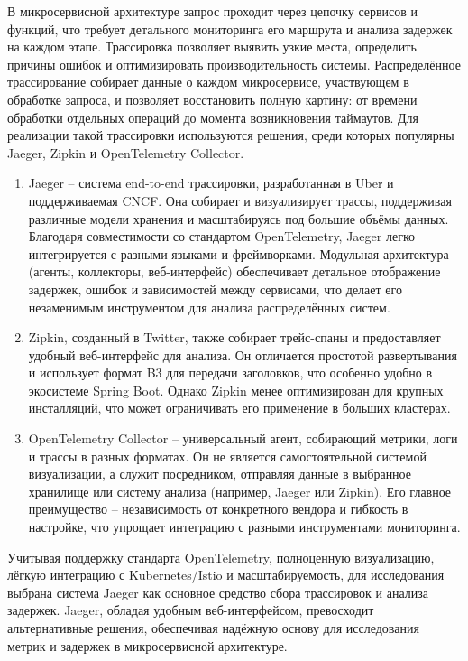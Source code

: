 В микросервисной архитектуре запрос проходит через цепочку сервисов и функций, что требует детального мониторинга его маршрута и анализа задержек на каждом этапе. Трассировка позволяет выявить узкие места, определить причины ошибок и оптимизировать производительность системы. Распределённое трассирование собирает данные о каждом микросервисе, участвующем в обработке запроса, и позволяет восстановить полную картину: от времени обработки отдельных операций до момента возникновения таймаутов. Для реализации такой трассировки используются решения, среди которых популярны Jaeger, Zipkin и OpenTelemetry Collector.
    \begin{enumerate}
    \item Jaeger\cite{jaeger} – система end-to-end трассировки, разработанная в Uber и поддерживаемая CNCF. Она собирает и визуализирует трассы, поддерживая различные модели хранения и масштабируясь под большие объёмы данных. Благодаря совместимости со стандартом OpenTelemetry, Jaeger легко интегрируется с разными языками и фреймворками. Модульная архитектура (агенты, коллекторы, веб-интерфейс) обеспечивает детальное отображение задержек, ошибок и зависимостей между сервисами, что делает его незаменимым инструментом для анализа распределённых систем.
    
    \item Zipkin\cite{Zipkin}, созданный в Twitter, также собирает трейс-спаны и предоставляет удобный веб-интерфейс для анализа. Он отличается простотой развертывания и использует формат B3 для передачи заголовков, что особенно удобно в экосистеме Spring Boot. Однако Zipkin менее оптимизирован для крупных инсталляций, что может ограничивать его применение в больших кластерах\cite{Borges_2021}.
    
    \item OpenTelemetry Collector\cite{otelcollector} – универсальный агент, собирающий метрики, логи и трассы в разных форматах. Он не является самостоятельной системой визуализации, а служит посредником, отправляя данные в выбранное хранилище или систему анализа (например, Jaeger или Zipkin). Его главное преимущество – независимость от конкретного вендора и гибкость в настройке, что упрощает интеграцию с разными инструментами мониторинга.
    \end{enumerate}

    Учитывая поддержку стандарта OpenTelemetry, полноценную визуализацию, лёгкую интеграцию с Kubernetes/Istio и масштабируемость, для исследования выбрана система Jaeger как основное средство сбора трассировок и анализа задержек. Jaeger, обладая удобным веб-интерфейсом, превосходит альтернативные решения, обеспечивая надёжную основу для исследования метрик  и задержек в микросервисной архитектуре.


